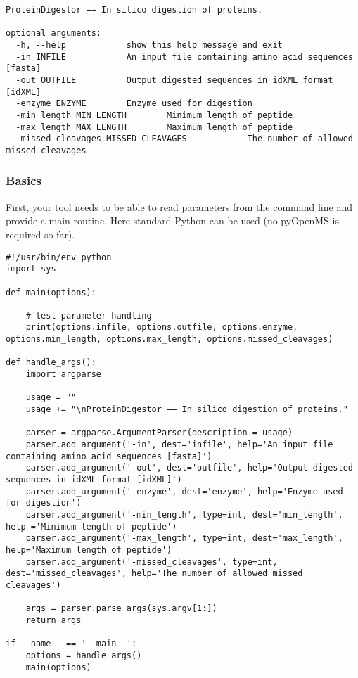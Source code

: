{\begin{lstlisting}
ProteinDigestor −− In silico digestion of proteins.

optional arguments:
  -h, --help            show this help message and exit
  -in INFILE            An input file containing amino acid sequences [fasta]
  -out OUTFILE          Output digested sequences in idXML format [idXML]
  -enzyme ENZYME        Enzyme used for digestion
  -min_length MIN_LENGTH		Minimum length of peptide
  -max_length MAX_LENGTH		Maximum length of peptide
  -missed_cleavages MISSED_CLEAVAGES			The number of allowed missed cleavages
\end{lstlisting}

\subsubsection{Basics}
First, your tool needs to be able to read parameters from the command line and provide a main routine. Here standard Python can be used (no pyOpenMS is required so far).

\begin{lstlisting}
#!/usr/bin/env python
import sys

def main(options):

    # test parameter handling
    print(options.infile, options.outfile, options.enzyme, options.min_length, options.max_length, options.missed_cleavages)

def handle_args():
    import argparse

    usage = ""
    usage += "\nProteinDigestor −− In silico digestion of proteins."

    parser = argparse.ArgumentParser(description = usage)
    parser.add_argument('-in', dest='infile', help='An input file containing amino acid sequences [fasta]')
    parser.add_argument('-out', dest='outfile', help='Output digested sequences in idXML format [idXML]')
    parser.add_argument('-enzyme', dest='enzyme', help='Enzyme used for digestion')
    parser.add_argument('-min_length', type=int, dest='min_length', help ='Minimum length of peptide')
    parser.add_argument('-max_length', type=int, dest='max_length', help='Maximum length of peptide')
    parser.add_argument('-missed_cleavages', type=int, dest='missed_cleavages', help='The number of allowed missed cleavages')

    args = parser.parse_args(sys.argv[1:])
    return args

if __name__ == '__main__':
    options = handle_args()
    main(options)
\end{lstlisting}

}
